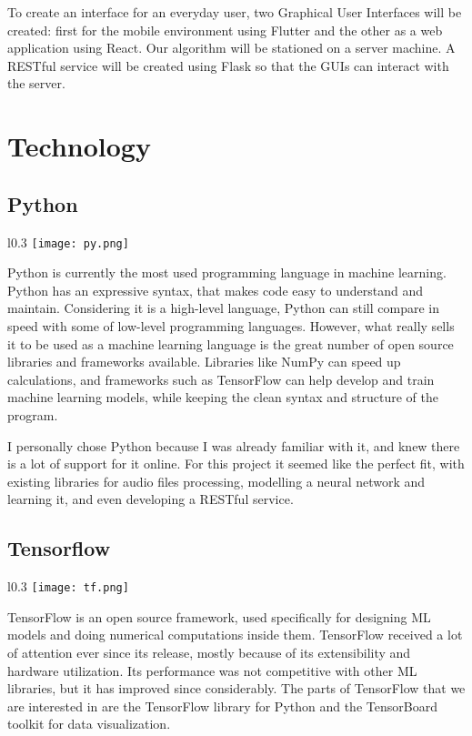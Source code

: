 \documentclass[../Thesis.tex]{subfiles}
\begin{document}
To create an interface for an everyday user, two Graphical User Interfaces will be created: first for the mobile environment using Flutter and the other as a web application using React. Our algorithm will be stationed on a server machine.  A RESTful service will be created using Flask so that the GUIs can interact with the server.


\section  {Technology}
\subsection {Python}

\begin{wrapfigure}{l}{0.3\textwidth}
\label {fig: python}
\texttt{[image: py.png]}
\end{wrapfigure}
Python is currently the most used programming language in machine learning. Python has an expressive syntax, that makes code easy to understand and maintain. Considering it is a high-level language, Python can still compare in speed with some of low-level programming languages. However, what really sells it to be used as a machine learning language is the great number of open source libraries and frameworks available. Libraries like NumPy can speed up calculations, and frameworks such as TensorFlow can help develop and train machine learning models, while keeping the clean syntax and structure of the program.

I personally chose Python because I was already familiar with it, and knew there is a lot of support for it online. For this project it seemed like the perfect fit, with existing libraries for audio files processing, modelling a neural network and learning it, and even developing a RESTful service.


\subsection {Tensorflow}

\begin{wrapfigure}{l}{0.3\textwidth}
\label {fig: tensorflow}
\texttt{[image: tf.png]}
\end{wrapfigure}
TensorFlow is an open source framework, used specifically for designing ML models and doing numerical computations inside them. TensorFlow received a lot of attention ever since its release, mostly because of its extensibility and hardware utilization. Its performance was not competitive with other ML libraries, but it has improved since considerably. The parts of TensorFlow that we are interested in are the TensorFlow library for Python and the TensorBoard toolkit for data visualization.  
\end{document}
